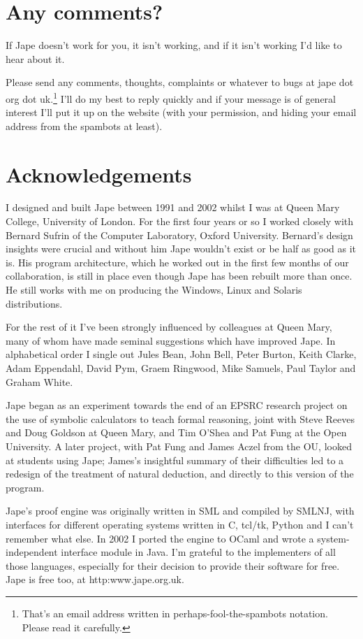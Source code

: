 \documentclass[11pt]{book}
\begin{document}
\section*{Any comments?}

If Jape doesn't work for you, it isn't working, and if it isn't working I'd like to hear about it. 

Please send any comments, thoughts, complaints or whatever to bugs at jape dot org dot uk.\footnote{That's an email address written in perhaps-fool-the-spambots notation. Please read it carefully.} I'll do my best to reply quickly and if your message is of general interest I'll put it up on the website (with your permission, and hiding your email address from the spambots at least). 

\section*{Acknowledgements}

I designed and built Jape between 1991 and 2002 whilst I was at Queen Mary College, University of London. For the first four years or so I worked closely with Bernard Sufrin of the Computer Laboratory, Oxford University. Bernard's design insights were crucial and without him Jape wouldn't exist or be half as good as it is. His program architecture, which he worked out in the first few months of our collaboration, is still in place even though Jape has been rebuilt more than once. He still works with me on producing the Windows, Linux and Solaris distributions.

For the rest of it I've been strongly influenced by colleagues at Queen Mary, many of whom have made seminal suggestions which have improved Jape. In alphabetical order I single out Jules Bean, John Bell, Peter Burton, Keith Clarke, Adam Eppendahl, David Pym, Graem Ringwood, Mike Samuels, Paul Taylor and Graham White. 

Jape began as an experiment towards the end of an EPSRC research project on the use of symbolic calculators to teach formal reasoning, joint with Steve Reeves and Doug Goldson at Queen Mary, and Tim O'Shea and Pat Fung at the Open University. A later project, with Pat Fung and James Aczel from the OU, looked at students using Jape; James's insightful summary of their difficulties led to a redesign of the treatment of natural deduction, and directly to this version of the program.

Jape's proof engine was originally written in SML and compiled by SMLNJ, with interfaces for different operating systems written in C, tcl/tk, Python and I can't remember what else. In 2002 I ported the engine to OCaml and wrote a system-independent interface module in Java. I'm grateful to the implementers of all those languages, especially for their decision to provide their software for free. Jape is free too, at http:www.jape.org.uk. 
\end{document}
